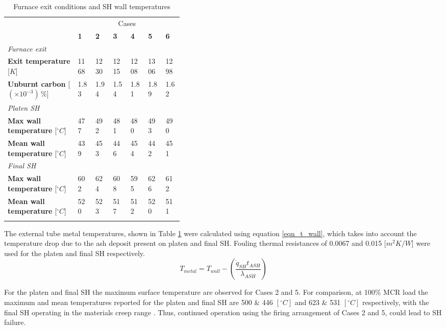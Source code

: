 \documentclass[review]{elsarticle}
\begin{document}
\begin{table}[h!]
\centering
\caption{Furnace exit conditions and SH wall temperatures}
\vspace{2mm}
{\tabulinesep=1.2mm
\begin{tabularx}{\linewidth}{p{0.4\linewidth} XXXXXX}
\hline
&\multicolumn{6}{c}{Cases}\\
 & \textbf{1} & \textbf{2} & \textbf{3}& \textbf{4}&\textbf{5}&\textbf{6}\\
\hline
\multicolumn{7}{l}{\textit{Furnace exit}}\\
\textbf{Exit temperature} [$K$] & 1168 & 1230 & 1215 & 1208 & 1306 & 1298\\
\textbf{Unburnt carbon} [$(\times 10^{-3})\,\%$] & 1.83 & 1.94 & 1.54 & 1.81 & 1.89 & 1.62\\
\multicolumn{7}{l}{\textit{Platen SH}}\\
\textbf{Max wall temperature} [$^{\circ}C$]  &477 & 492 & 481  & 480 & 493 & 490\\
\textbf{Mean wall temperature} [$^{\circ}C$] &439 & 453 & 446 & 454 & 442 & 451\\
\multicolumn{7}{l}{\textit{Final SH}}\\
\textbf{Max wall temperature} [$^{\circ}C$]  & 602 & 624 & 608 & 595 & 626 & 612\\
\textbf{Mean wall temperature} [$^{\circ}C$] & 520 & 523 & 517 & 512 & 520 & 511\\
\hline
\label{tbl_cfd_results}
\end{tabularx}}
\end{table}
The external tube metal temperatures, shown in Table \ref{tbl_cfd_results} were calculated using equation \ref{eqn_t_wall}, which takes into account the temperature drop due to the ash deposit present on platen and final SH. Fouling thermal resistances of 0.0067 and 0.015 [$m^2K/W$] were used for the platen and final SH respectively.
\begin{equation}\label{eqn_t_wall}
T_{metal} = T_{wall} - \left(\frac{\dot{q}_{SH}t_{ASH}}{\lambda_{ASH}}\right)
\end{equation}

For the platen and final SH the maximum surface temperature are observed for Cases 2 and 5. For comparison, at 100\% MCR load the maximum and mean temperatures reported for the platen and final SH are 500 \& 446 $[^\circ C]$ and 623 \& 531 $[^\circ C]$ respectively, with the final SH operating in the materials creep range \cite{Laubscher2019b}. Thus, continued operation using the firing arrangement of Cases 2 and 5, could lead to SH failure.\\
\end{document}
